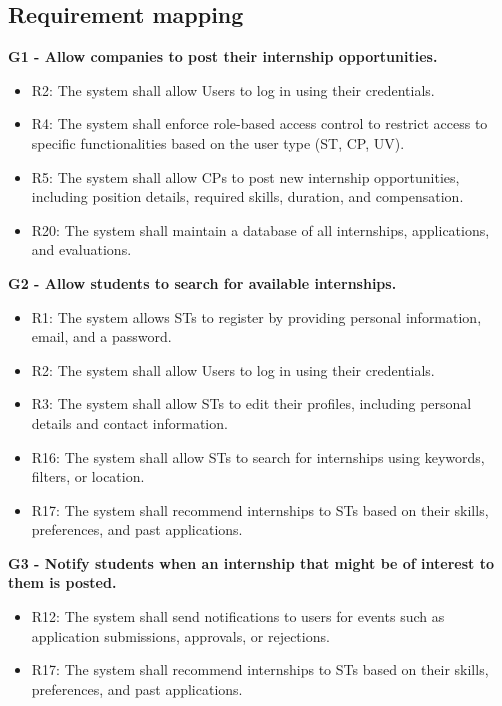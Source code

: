 \newpage

\subsection{Requirement mapping}
\label{subsec:requirement_mapping}%
\textbf{G1 - Allow companies to post their internship opportunities.}
\begin{itemize}
    \item R2: The system shall allow Users to log in using their credentials.
    \item R4: The system shall enforce role-based access control to restrict access to specific functionalities based on the user type (ST, CP, UV).
    \item R5: The system shall allow CPs to post new internship opportunities, including position details, required skills, duration, and compensation.
    \item R20: The system shall maintain a database of all internships, applications, and evaluations.
\end{itemize}

\vspace{1.5cm}
\textbf{G2 - Allow students to search for available internships.}
\begin{itemize}
    \item R1: The system allows STs to register by providing personal information, email, and a password.
    \item R2: The system shall allow Users to log in using their credentials.
    \item R3: The system shall allow STs to edit their profiles, including personal details and contact information.
    \item R16: The system shall allow STs to search for internships using keywords, filters, or location.
    \item R17: The system shall recommend internships to STs based on their skills, preferences, and past applications.
\end{itemize}

\vspace{1.5cm}
\textbf{G3 - Notify students when an internship that might be of interest to them is posted.}
\begin{itemize}
    \item R12: The system shall send notifications to users for events such as application submissions, approvals, or rejections.
    \item R17: The system shall recommend internships to STs based on their skills, preferences, and past applications.
\end{itemize}

